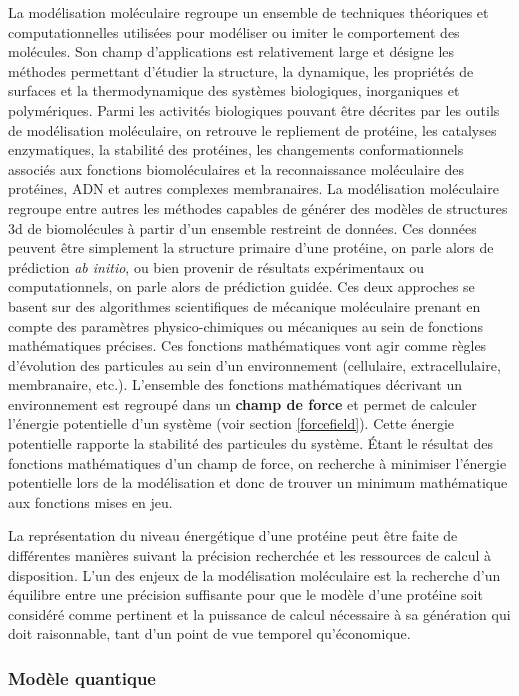La modélisation moléculaire regroupe un ensemble de techniques théoriques et computationnelles utilisées pour modéliser ou imiter le comportement des molécules.
Son champ d'applications est relativement large et désigne les méthodes permettant d'étudier la structure, la dynamique, les propriétés de surfaces et la thermodynamique des systèmes biologiques, inorganiques et polymériques. Parmi les activités biologiques pouvant être décrites par les outils de modélisation moléculaire, on retrouve le repliement de protéine, les catalyses enzymatiques, la stabilité des protéines, les changements conformationnels associés aux fonctions biomoléculaires et la reconnaissance moléculaire des protéines, ADN et autres complexes membranaires.
La modélisation moléculaire regroupe entre autres les méthodes capables de générer des modèles de structures 3d de biomolécules à partir d'un ensemble restreint de données. Ces données peuvent être simplement la structure primaire d'une protéine, on parle alors de prédiction \textit{ab initio}, ou bien provenir de résultats expérimentaux ou computationnels, on parle alors de prédiction guidée. Ces deux approches se basent sur des algorithmes scientifiques de mécanique moléculaire prenant en compte des paramètres physico-chimiques ou mécaniques au sein de fonctions mathématiques précises. Ces fonctions mathématiques vont agir comme règles d'évolution des particules au sein d'un environnement (cellulaire, extracellulaire, membranaire, etc.). L'ensemble des fonctions mathématiques décrivant un environnement est regroupé dans un \textbf{champ de force} et permet de calculer l'énergie potentielle d'un système (voir section \ref{forcefield}). Cette énergie potentielle rapporte la stabilité des particules du système. Étant le résultat des fonctions mathématiques d'un champ de force, on recherche à minimiser l'énergie potentielle lors de la modélisation et donc de trouver un minimum mathématique aux fonctions mises en jeu.

La représentation du niveau énergétique d'une protéine peut être faite de différentes manières suivant la précision recherchée et les ressources de calcul à disposition. L'un des enjeux de la modélisation moléculaire est la recherche d'un équilibre entre une précision suffisante pour que le modèle d'une protéine soit considéré comme pertinent et la puissance de calcul nécessaire à sa génération qui doit raisonnable, tant d'un point de vue temporel qu'économique.

\subsubsection{Modèle quantique}

